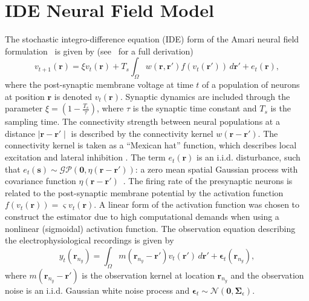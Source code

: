 \documentclass[journal]{IEEEtran}
\begin{document}
\section{IDE Neural Field Model}
The stochastic integro-difference equation (IDE) form of the Amari neural field  formulation~\cite{Amari1977} is given by (see~\cite{Freestone2011} for a full derivation)
\begin{equation}\label{eq:DiscreteTimeModel}
	v_{t+1}\left(\mathbf{r}\right) = 
	\xi v_t\left(\mathbf{r}\right) + 
	T_s \int_\Omega { 
	    w\left(\mathbf{r},\mathbf{r'}\right)
	    f\left(v_t\left(\mathbf{r}'\right)\right) 
	\, d\mathbf{r}'} 
	+ e_t\left(\mathbf{r}\right), 
\end{equation}
where the post-synaptic membrane voltage at time $t$ of a population of neurons at position $\mathbf r$ is denoted $v_t\left(\mathbf r\right)$. Synaptic dynamics are included through the parameter $\xi=\left(1-\frac{ T_s}{\tau}\right)$, where $\tau$ is the synaptic time constant and $T_s$ is the sampling time. The connectivity strength between neural populations at a distance $\mid\mathbf{r}-\mathbf{r'}\mid$ is described by the connectivity kernel $w\left(\mathbf{r}-\mathbf{r}'\right)$. The connectivity kernel is taken as a ``Mexican hat'' function, which describes local excitation and lateral inhibition \cite{Amari1977}. The term $e_t(\mathbf r)$ is an i.i.d. disturbance, such that $e_t(\mathbf{s})\sim\mathcal{GP}(\mathbf 0,\eta(\mathbf{r}-\mathbf{r'}))$: a zero mean spatial Gaussian process with covariance function $\eta(\mathbf{r}-\mathbf{r'})$~\cite{Rasmussen2005}. The firing rate of the presynaptic neurons is related to the post-synaptic membrane potential by the activation function $f(v_t(\mathbf{r})) = \varsigma v_t(\mathbf{r})$. A linear form of the activation function was chosen to construct the estimator due to high computational demands when using a nonlinear (sigmoidal) activation function. The observation equation describing the electrophysiological recordings is given by
\begin{equation}\label{eq:ObservationEquation}
	y_t(\mathbf{r}_{n_y}) = \int_{\Omega} { m\left(\mathbf{r}_{n_y}-\mathbf{r}'\right) v_t\left(\mathbf{r}'\right) \, d\mathbf{r}'} + \boldsymbol\epsilon_t(\mathbf{r}_{n_y}), 
\end{equation}
where $m\left(\mathbf{r}_{n_y}-\mathbf{r}'\right)$ is the observation kernel at location $\mathbf{r}_{n_y}$ and the observation noise is an i.i.d. Gaussian white noise process and $\boldsymbol{\epsilon}_{t}\sim \mathcal{N}\left(\mathbf{0},\mathbf{\Sigma}_{\epsilon}\right)$. %
\end{document}
